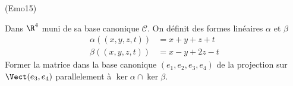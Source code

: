 \begin{tiny}(Emo15)\end{tiny} Dans $\R^4$ muni de sa base canonique $\mathcal{C}$. On définit des formes linéaires $\alpha$ et $\beta$
\begin{align*}
 \alpha((x,y,z,t)) &=x+y+z+t\\
\beta((x,y,z,t)) &=x-y+2z-t
\end{align*}
Former la matrice dans la base canonique  $(e_1,e_2,e_3,e_4)$ de la projection sur $\Vect(e_3,e_4)$ parallelement à $\ker \alpha \cap \ker\beta$.